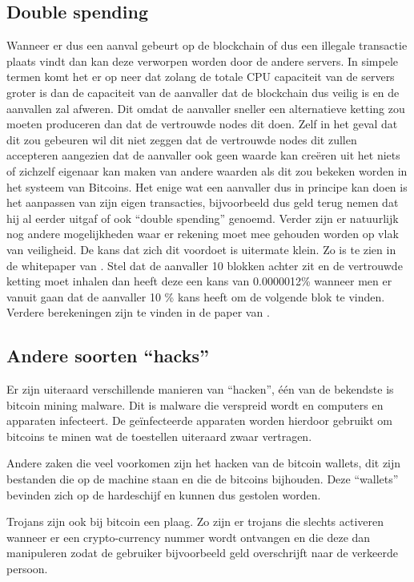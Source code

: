 \subsection{Double spending}
\label{sec:hoeveiligisblockchain}
Wanneer er dus een aanval gebeurt op de blockchain of dus een illegale transactie plaats vindt dan kan deze verworpen worden door de andere servers. In simpele termen komt het er op neer dat zolang de totale CPU capaciteit van de servers groter is dan de capaciteit van de aanvaller dat de blockchain dus veilig is en de aanvallen zal afweren. Dit omdat de aanvaller sneller een alternatieve ketting zou moeten produceren  dan dat de vertrouwde nodes dit doen. Zelf in het geval dat dit zou gebeuren wil dit niet zeggen dat de vertrouwde nodes dit zullen accepteren aangezien dat de aanvaller ook geen waarde kan creëren uit het niets of zichzelf eigenaar kan maken van andere waarden als dit zou bekeken worden in het systeem van Bitcoins. Het enige wat een aanvaller dus in principe kan doen is het aanpassen van zijn eigen transacties, bijvoorbeeld dus geld terug nemen dat hij al eerder uitgaf of ook ``double spending'' genoemd. Verder zijn er natuurlijk nog andere mogelijkheden waar er rekening moet mee gehouden worden op vlak van veiligheid. De kans dat zich dit voordoet is uitermate klein. Zo is te zien in de whitepaper van \textcite{Nakamoto2008}. Stel dat de aanvaller 10 blokken achter zit en de vertrouwde ketting moet inhalen dan heeft deze een kans van 0.0000012\% wanneer men er vanuit gaan dat de aanvaller 10 \% kans heeft om de volgende blok te vinden. Verdere berekeningen zijn te vinden in de paper van \autocite{Nakamoto2008}.

\subsection{Andere soorten ``hacks''}
Er zijn uiteraard verschillende manieren van ``hacken'', één van de bekendste is bitcoin mining malware. Dit is malware die verspreid wordt en computers en apparaten infecteert. De geïnfecteerde apparaten worden hierdoor gebruikt om bitcoins te minen wat de toestellen uiteraard zwaar vertragen. 

Andere zaken die veel voorkomen zijn het hacken van de bitcoin wallets, dit zijn bestanden die op de machine staan en die de bitcoins bijhouden. Deze ``wallets'' bevinden zich op de hardeschijf en kunnen dus gestolen worden. 

Trojans zijn ook bij bitcoin een plaag. Zo zijn er trojans die slechts activeren wanneer er een crypto-currency nummer wordt ontvangen en die deze dan manipuleren zodat de gebruiker bijvoorbeeld geld overschrijft naar de verkeerde persoon. 

